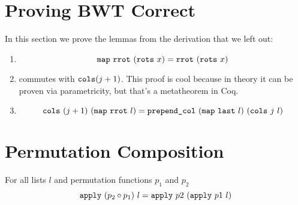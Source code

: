 \documentclass[11pt]{thesis}
\begin{document}
\appendix

\section{Proving BWT Correct}
\label{appendix:BWT_proof}

In this section we prove the lemmas from the derivation that we left out:
\begin{enumerate}
\item
\begin{equation*}
  \texttt{map}~\texttt{rrot}~(\texttt{rots}~x) = \texttt{rrot}~(\texttt{rots}~x)
\end{equation*}

\item {} commutes with $\texttt{cols} (j+1)$.
  This proof is cool because in theory it can be proven via
  parametricity, but that's a metatheorem in Coq.

\item
  \begin{equation*}
    \texttt{cols}~(j+1)~(\texttt{map}~\texttt{rrot}~l) = \texttt{prepend\_col}~(\texttt{map}~\texttt{last}~l)~(\texttt{cols}~j~l)
  \end{equation*}
\end{enumerate}


\section{Permutation Composition}
\label{appendix:perm_comp}

\begin{theorem}
  For all lists $l$ and permutation functions $p_1$ and $p_2$
  \begin{equation*}
      \texttt{apply}~(p_2 \circ p_1)~l = \texttt{apply}~p2~(\texttt{apply}~p1~l)
  \end{equation*}
\end{theorem}

\printbibliography{}
\end{document}
